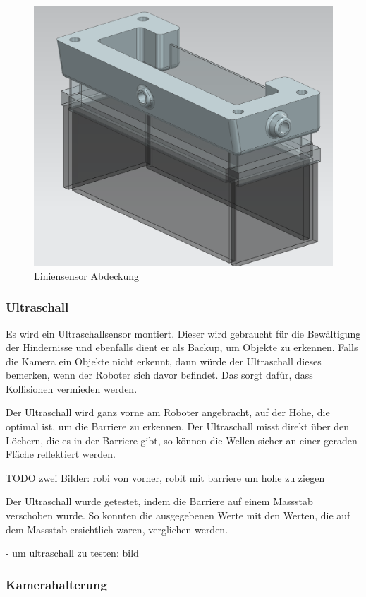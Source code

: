 \begin{figure}
    \centering
    \includegraphics[width=0.75\linewidth]{assets//MT/Sensor Abdeckung.png}
    \caption{Liniensensor Abdeckung}
    \label{fig:Liniensensor Abdeckung}
\end{figure}
\newpage

\subsubsection{Ultraschall}

Es wird ein Ultraschallsensor montiert. Dieser wird gebraucht für die Bewältigung der Hindernisse und ebenfalls dient er als Backup, um Objekte zu erkennen. Falls die Kamera ein Objekte nicht erkennt, dann würde der Ultraschall dieses bemerken, wenn der Roboter sich davor befindet. Das sorgt dafür, dass Kollisionen vermieden werden.

Der Ultraschall wird ganz vorne am Roboter angebracht, auf der Höhe, die optimal ist, um die Barriere zu erkennen. Der Ultraschall misst direkt über den Löchern, die es in der Barriere gibt, so können die Wellen sicher an einer geraden Fläche reflektiert werden.

TODO zwei Bilder: robi von vorner, robit mit barriere um hohe zu ziegen

Der Ultraschall wurde getestet, indem die Barriere auf einem Massstab verschoben wurde. So konnten die ausgegebenen Werte mit den Werten, die auf dem Massstab ersichtlich waren, verglichen werden.

- um ultraschall zu testen: bild

\subsubsection{Kamerahalterung}
\label{Kamera Halter}

